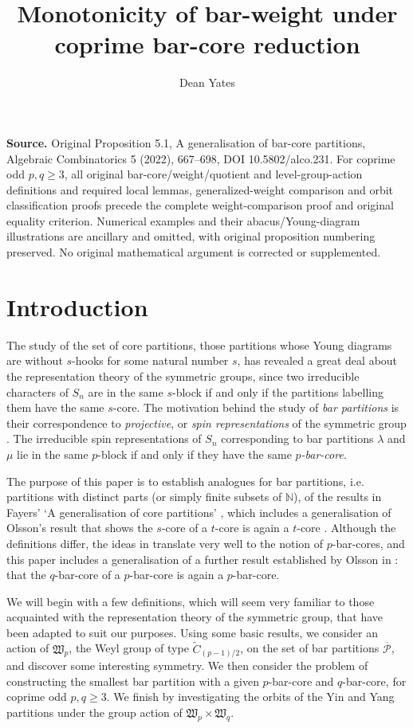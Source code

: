 \documentclass[10pt]{amsart}
\title{Monotonicity of bar-weight under coprime bar-core reduction}
\author{Dean Yates}
\date{}
\begin{document}
\maketitle
\noindent\textbf{Source.} Original Proposition 5.1, A generalisation of bar-core partitions, Algebraic Combinatorics 5 (2022), 667--698, DOI 10.5802/alco.231. For coprime odd $p,q\geq3$, all original bar-core/weight/quotient and level-group-action definitions and required local lemmas, generalized-weight comparison and orbit classification proofs precede the complete weight-comparison proof and original equality criterion. Numerical examples and their abacus/Young-diagram illustrations are ancillary and omitted, with original proposition numbering preserved. No original mathematical argument is corrected or supplemented.
\section{Introduction}
 
The study of the set of core partitions, those partitions whose Young diagrams are without $s$-hooks for some natural number $s$, has revealed a great deal about the representation theory of the symmetric groups, since two irreducible characters of $S_n$ are in the same $s$-block if and only if the partitions labelling them have the same $s$-core. The motivation behind the study of \textit{bar partitions} is their correspondence to \textit{projective}, or \textit{spin representations} of the symmetric group \cite{HH}. The irreducible spin representations of $S_n$ corresponding to bar partitions $\lambda$ and $\mu$ lie in the same $p$-block if and only if they have the same $p$\textit{-bar-core}.  

The purpose of this paper is to establish analogues for bar partitions, i.e. partitions with distinct parts (or simply finite subsets of $\mathbb{N}$), of the results in Fayers' `A generalisation of core partitions' \cite{F1}, which includes a generalisation of Olsson's result that shows the $s$-core of a $t$-core is again a $t$-core \cite{O2}. Although the definitions differ, the ideas in \cite{F1} translate very well to the notion of $p$-bar-cores, and this paper includes a generalisation of a further result established by Olsson in \cite{O2}: that the $q$-bar-core of a $p$-bar-core is again a $p$-bar-core. 

We will begin with a few definitions, which will seem very familiar to those acquainted with the representation theory of the symmetric group, that have been adapted to suit our purposes. Using some basic results, we consider an action of $\mathfrak{W}_p$, the Weyl group of type $\tilde{C}_{(p-1)/2}$, on the set of bar partitions $\overline{\mathcal{P}}$, and discover some interesting symmetry. We then consider the problem of constructing the smallest bar partition with a given $p$-bar-core and $q$-bar-core, for coprime odd $p,q\geq3$. We finish by investigating the orbits of the Yin and Yang partitions \cite{BO} under the group action of $\mathfrak{W}_p\times\mathfrak{W}_q$. 
\end{document}
